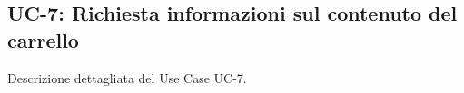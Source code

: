 \subsection{UC-7: Richiesta informazioni sul contenuto del carrello}

Descrizione dettagliata del Use Case UC-7.
